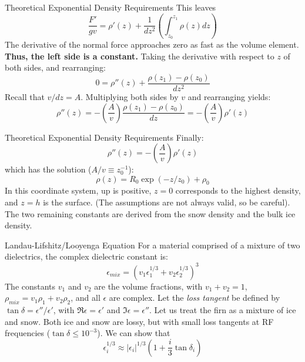 \documentclass{beamer}
\begin{document}
\begin{frame}{Theoretical Exponential Density Requirements}
This leaves
\begin{equation}
\frac{F'}{gv} = \rho'(z) + \frac{1}{dz^2}\left(\int_{z_0}^{z_1} \rho(z)dz \right)
\end{equation}
The derivative of the normal force approaches zero as fast as the volume element.  \textbf{Thus, the left side is a constant.}  Taking the derivative with respect to $z$ of both sides, and rearranging:
\begin{equation}
0 = \rho''(z) + \frac{\rho(z_1)-\rho(z_0)}{dz^2}
\end{equation}
Recall that $v/dz = A$.  Multiplying both sides by $v$ and rearranging yields:
\begin{equation}
\rho''(z) = -\left(\frac{A}{v}\right)\frac{\rho(z_1)-\rho(z_0)}{dz} = -\left(\frac{A}{v}\right) \rho'(z)
\end{equation}
\end{frame}

\begin{frame}{Theoretical Exponential Density Requirements}
Finally:
\begin{equation}
\rho''(z) = -\left(\frac{A}{v}\right) \rho'(z)
\end{equation}
which has the solution ($A/v \equiv z_0^{-1}$):
\begin{equation}
\boxed{\rho(z) = R_0 \exp(-z/z_0) + \rho_0}
\end{equation}
In this coordinate system, up is positive, $z = 0$ corresponds to the highest density, and $z = h$ is the surface.  (The assumptions are not always valid, so be careful).  The two remaining constants are derived from the snow density and the bulk ice density.
\end{frame}

\begin{frame}{Landau-Lifshitz/Looyenga Equation}
For a material comprised of a mixture of two dielectrics, the complex dielectric constant is:
\begin{equation}
\epsilon_{mix} = \left(v_1\epsilon_1^{1/3} + v_2\epsilon_2^{1/3}\right)^3
\end{equation}
The constants $v_1$ and $v_2$ are the volume fractions, with $v_1 + v_2 = 1$, $\rho_{mix} = v_1 \rho_1 + v_2 \rho_2$, and all $\epsilon$ are complex.  Let the \textit{loss tangent} be defined by $\tan\delta = \epsilon''/\epsilon'$, with $\Re{\epsilon} = \epsilon'$ and $\Im{\epsilon} = \epsilon''$.  Let us treat the firn as a mixture of ice and snow.  Both ice and snow are lossy, but with small loss tangents at RF frequencies ($\tan\delta \leq 10^{-3}$).  We can show that
\begin{equation}
\epsilon_i^{1/3} \approx |\epsilon_i|^{1/3}\left(1+\frac{i}{3}\tan\delta_i\right)
\end{equation}
\end{frame}
\end{document}
